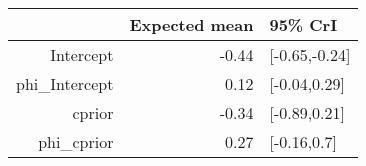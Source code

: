 \begin{tabular}{rrl}
  \hline
 & Expected mean & 95\% CrI \\ 
  \hline
Intercept & -0.44 & [-0.65,-0.24] \\ 
  phi\_Intercept & 0.12 & [-0.04,0.29] \\ 
  cprior & -0.34 & [-0.89,0.21] \\ 
  phi\_cprior & 0.27 & [-0.16,0.7] \\ 
   \hline
\end{tabular}

